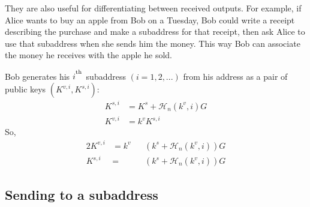 They are also useful for differentiating between received outputs. For example, if Alice wants to buy an apple from Bob on a Tuesday, Bob could write a receipt describing the purchase and make a subaddress for that receipt, then ask Alice to use that subaddress when she sends him the money. This way Bob can associate the money he receives with the apple he sold.

Bob generates his $i^\textsuperscript{th}$ subaddress $(i = 1, 2, ...)$ from his address as a pair of public keys $(K^{v,i}, K^{s,i})$:\vspace{.175cm}
\begin{align*}
    K^{s,i} &= K^s + \mathcal{H}_n(k^v, i) G\\
    K^{v,i} &= k^v K^{s,i}
\end{align*}
\quad So,
\begin{alignat*}{2}
    K^{v,i} &= k^v&&(k^s + \mathcal{H}_n(k^v, i))G\\
    K^{s,i} &= &&(k^s + \mathcal{H}_n(k^v, i))G
\end{alignat*}
    

\subsection{Sending to a subaddress}
\label{subsec:subaddresses-sending-to}
    
